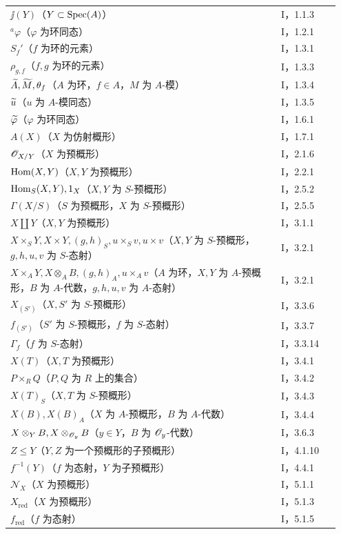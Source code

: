 \begin{longtable}{@{}p{0.78\linewidth}p{0.17\linewidth}@{}}
$\jj(Y)$（$Y\subset\operatorname{Spec}(A)$）&I，1.1.3\\
${}^{a}\varphi$（$\varphi$ 为环同态）&I，1.2.1\\
$S_f'$（$f$ 为环的元素）&I，1.3.1\\
$\rho_{g,f}$（$f,g$ 为环的元素）&I，1.3.3\\
$\widetilde{A},\widetilde{M},\theta_f$（$A$ 为环，$f\in A$，$M$ 为 $A$-模）&I，1.3.4\\
$\widetilde{u}$（$u$ 为 $A$-模同态）&I，1.3.5\\
$\widetilde{\varphi}$（$\varphi$ 为环同态）&I，1.6.1\\
$A(X)$（$X$ 为仿射概形）&I，1.7.1\\
$\mathscr O_{X/Y}$（$X$ 为预概形）&I，2.1.6\\
$\operatorname{Hom}(X,Y)$（$X,Y$ 为预概形）&I，2.2.1\\
$\operatorname{Hom}_S(X,Y),1_X$（$X,Y$ 为 $S$-预概形）&I，2.5.2\\
$\Gamma(X/S)$（$S$ 为预概形，$X$ 为 $S$-预概形）&I，2.5.5\\
$X\amalg Y$（$X,Y$ 为预概形）&I，3.1.1\\
$X\times_S Y,X\times Y,(g,h)_S,u\times_Sv,u\times v$（$X,Y$ 为 $S$-预概形，$g,h,u,v$ 为 $S$-态射）&I，3.2.1\\
$X\times_A Y,X\otimes_A B,(g,h)_A,u\times_Av$（$A$ 为环，$X,Y$ 为 $A$-预概形，$B$ 为 $A$-代数，$g,h,u,v$ 为 $A$-态射）&I，3.2.1\\
$X_{(S')}$（$X,S'$ 为 $S$-预概形）&I，3.3.6\\
$f_{(S')}$（$S'$ 为 $S$-预概形，$f$ 为 $S$-态射）&I，3.3.7\\
$\Gamma_f$（$f$ 为 $S$-态射）&I，3.3.14\\
$X(T)$（$X,T$ 为预概形）&I，3.4.1\\
$P\times_R Q$（$P,Q$ 为 $R$ 上的集合）&I，3.4.2\\
$X(T)_S$（$X,T$ 为 $S$-预概形）&I，3.4.3\\
$X(B),X(B)_A$（$X$ 为 $A$-预概形，$B$ 为 $A$-代数）&I，3.4.4\\
$X\otimes_Y B,X\otimes_{\mathscr O_y}B$（$y\in Y$，$B$ 为 $\mathscr O_y$-代数）&I，3.6.3\\
$Z\le Y$（$Y,Z$ 为一个预概形的子预概形）&I，4.1.10\\
$f^{-1}(Y)$（$f$ 为态射，$Y$ 为子预概形）&I，4.4.1\\
$\mathscr N_X$（$X$ 为预概形）&I，5.1.1\\
$X_{\mathrm{red}}$（$X$ 为预概形）&I，5.1.3\\
$f_{\mathrm{red}}$（$f$ 为态射）&I，5.1.5\\

\end{longtable}
